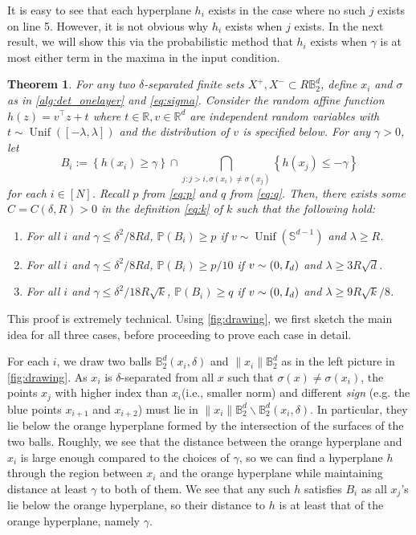 \documentclass[aoap]{imsart}
\numberwithin{equation}{section}
\newtheorem{theorem}{Theorem}[section]
\theoremstyle{definition}
\theoremstyle{remark}
\newcommand{\N}{\mathbb{N}}
\numberwithin{equation}{section}
\renewcommand{\S}{\mathbb{S}}
\newcommand{\0}{\mathbf{0}}
\newcommand{\1}{\mathbf{1}}
\renewcommand{\P}{\mathbb{P}}
\newcommand{\B}{\mathbb{B}}
\renewcommand{\S}{\mathbb{S}}
\DeclareMathOperator{\Unif}{Unif}
\let \N \relax
\DeclareMathOperator{\N}{N}
\numberwithin{equation}{section}
\begin{document}
It is easy to see that each hyperplane $h_i$ exists in the case where no such $j$ exists on line 5. However, it is not obvious why $h_i$ exists when $j$ exists. In the next result, we will show this via the probabilistic method that $h_i$ exists when $\gamma$ is at most either term in the maxima in the input condition.
\begin{theorem}\label{thm:prob}
For any two $\delta$-separated finite sets $X^{+}, X^{-}\subset R\B_{2}^{d}$, define $x_i$ and $\sigma$ as in \cref{alg:det_onelayer} and \eqref{eq:sigma}. Consider the random affine function $h(z)=v^{\intercal}z+t$ where $t\in \mathbb{R},v\in \mathbb{R}^d$ are independent random variables with $t\sim\Unif\left([-\lambda, \lambda]\right)$ and the distribution of $v$ is specified below. For any $\gamma>0$, let
\[ B_{i}:=\left\lbrace h(x_{i})\geq \gamma \right\rbrace\cap \bigcap_{j:j>i, \sigma(x_i) \neq\sigma(x_j)  }\left\lbrace h(x_{j})\leq -\gamma \right\rbrace\]
for each $i\in [N]$. Recall $p$ from \eqref{eq:p} and $q$ from \eqref{eq:q}. Then, there exists some $C=C(\delta, R)>0$ in the definition \eqref{eq:k} of $k$ such that the following hold:
\begin{enumerate}
    \item[(i)] For all $i$ and $\gamma \leq {\delta^{2}}/{8Rd}$, $\P (B_{i})\geq p$ if $v\sim\Unif \left(\S^{d-1}\right)$ and $\lambda\geq R$.
    \item[(ii)] For all $i$ and $\gamma \leq {\delta^{2}}/{8Rd}$, $\P (B_{i})\geq p/10$ if $v\sim \N(0, I_{d})$ and $\lambda\geq 3R\sqrt{d}$.
    \item[(iii)] For all $i$ and $\gamma \leq {\delta^{2}}/{18R\sqrt{k}}$, $\P (B_{i})\geq q$ if $v\sim \N(0, I_{d})$ and $\lambda\geq 9R\sqrt{k}/8$.
\end{enumerate}
\end{theorem}


This proof is extremely technical. Using \cref{fig:drawing}, we first sketch the main idea for all three cases, before proceeding to prove each case in detail.

For each $i$, we draw two balls $\B^d_2(x_i,\delta)$ and $\|x_i\|\B_2^d$ as in the left picture in \cref{fig:drawing}. As $x_i$ is $\delta$-separated from all $x$ such that $\sigma(x)\neq \sigma(x_i)$, the points $x_j$ with higher index than $x_i$(i.e., smaller norm) and different \emph{sign} (e.g. the blue points $x_{i+1}$ and $x_{i+2}$) must lie in $\|x_i\|\B_2^d\backslash \B^d_2(x_i,\delta)$. In particular, they lie below the orange hyperplane formed by the intersection of the surfaces of the two balls. Roughly, we see that the distance between the orange hyperplane and $x_i$ is large enough compared to the choices of $\gamma$, so we can find a hyperplane $h$ through the region between $x_i$ and the orange hyperplane while maintaining distance at least $\gamma$ to both of them. We see that any such $h$ satisfies $B_i$ as all $x_j$'s lie below the orange hyperplane, so their distance to $h$ is at least that of the orange hyperplane, namely $\gamma$.
\end{document}
